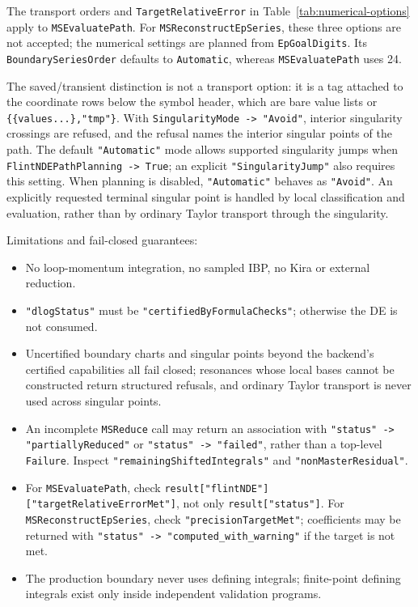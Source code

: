 \documentclass[11pt,a4paper]{article}
\numberwithin{table}{section}
\begin{document}
The transport orders and \texttt{TargetRelativeError} in Table~\ref{tab:numerical-options} apply to
\texttt{MSEvaluatePath}. For \texttt{MSReconstructEpSeries}, these three options
are not accepted; the numerical settings are planned from \texttt{EpGoalDigits}.
Its \texttt{BoundarySeriesOrder} defaults to \texttt{Automatic}, whereas
\texttt{MSEvaluatePath} uses 24.

The saved/transient distinction is not a transport option: it is a tag attached to the coordinate
rows below the symbol header, which are bare value lists or \texttt{\{\{values...\},"tmp"\}}.
With \texttt{SingularityMode -> "Avoid"}, interior singularity crossings are refused, and the
refusal names the interior singular points of the path. The default \texttt{"Automatic"} mode
allows supported singularity jumps when \texttt{FlintNDEPathPlanning -> True};
an explicit \texttt{"SingularityJump"} also requires this setting.
When planning is disabled, \texttt{"Automatic"} behaves as \texttt{"Avoid"}.
An explicitly requested
terminal singular point is handled by local classification and evaluation,
rather than by ordinary Taylor transport through the singularity.


Limitations and fail-closed guarantees:
\begin{itemize}
  \item No loop-momentum integration, no sampled IBP, no Kira or external reduction.
  \item \texttt{"dlogStatus"} must be \texttt{"certifiedByFormulaChecks"}; otherwise the DE is not
        consumed.
  \item Uncertified boundary charts and singular points beyond the
        backend's certified capabilities all fail closed; resonances whose local bases cannot be
        constructed return structured refusals, and ordinary Taylor transport is never used across
        singular points.
  \item An incomplete \texttt{MSReduce} call may return an association with
        \texttt{"status" -> "partiallyReduced"} or \texttt{"status" -> "failed"},
        rather than a top-level \texttt{Failure}. Inspect
        \texttt{"remainingShiftedIntegrals"} and \texttt{"nonMasterResidual"}.
  \item For \texttt{MSEvaluatePath}, check
        \texttt{result["flintNDE"]["targetRelativeErrorMet"]}, not only
        \texttt{result["status"]}. For \texttt{MSReconstructEpSeries}, check
        \texttt{"precisionTargetMet"}; coefficients may be returned with
        \texttt{"status" -> "computed\_with\_warning"} if the target is not met.
  \item The production boundary never uses defining integrals; finite-point defining integrals
        exist only inside independent validation programs.
\end{itemize}
\end{document}
